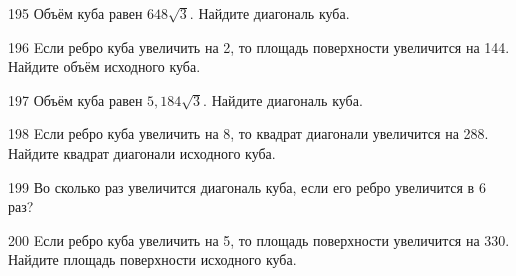 \begin{taskBN}{195}
Объём куба равен $648\sqrt{3}$. Найдите диагональ куба.
\end{taskBN}

\begin{taskBN}{196}
Eсли ребро куба увеличить на 2, то площадь поверхности увеличится на 144. Найдите объём исходного куба.
\end{taskBN}

\begin{taskBN}{197}
Объём куба равен $5,184\sqrt{3}$. Найдите диагональ куба.
\end{taskBN}

\begin{taskBN}{198}
Eсли ребро куба увеличить на 8, то квадрат диагонали увеличится на 288. Найдите квадрат диагонали исходного куба.
\end{taskBN}

\begin{taskBN}{199}
Во сколько раз увеличится диагональ куба, если его ребро увеличится в 6 раз?
\end{taskBN}

\begin{taskBN}{200}
Eсли ребро куба увеличить на 5, то площадь поверхности увеличится на 330. Найдите площадь поверхности исходного куба.
\end{taskBN}

